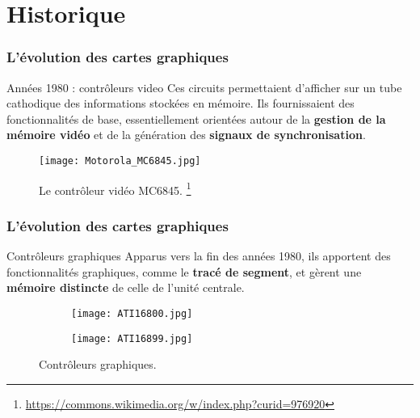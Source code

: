 \section{Historique}
\begin{frame}
    \frametitle{L'évolution des cartes graphiques}
\begin{block}{Années 1980 : contrôleurs video}
  Ces circuits permettaient d'afficher sur un tube cathodique 
  des informations stockées en mémoire. Ils fournissaient des fonctionnalités de base, essentiellement orientées
  autour de la {\bf gestion de la mémoire vidéo} et de la génération des {\bf signaux de synchronisation}. 
  \begin{figure}[ht]
    \centering
    \texttt{[image: Motorola\_MC6845.jpg]}
    \caption{Le contrôleur vidéo MC6845. \footnote{\tiny \url{https://commons.wikimedia.org/w/index.php?curid=976920}}}
    \label{fig:MC6845}
  \end{figure}
\end{block}
\end{frame}
\begin{frame}
  \frametitle{L'évolution des cartes graphiques}
\begin{block}{Contrôleurs graphiques}
  Apparus vers la fin des années 1980, ils apportent des fonctionnalités graphiques, comme le {\bf tracé de segment}, 
  et gèrent une {\bf mémoire distincte} de celle de l'unité centrale.
   \begin{figure}[htbp]
    \centering
    \hfill
   \begin{subfigure}{0.4\textwidth}
    \texttt{[image: ATI16800.jpg]}
   \end{subfigure} 
   \hfill
   \begin{subfigure}{0.4\textwidth}
    \texttt{[image: ATI16899.jpg]}
   \end{subfigure} 
   \hfill
    \caption{Contrôleurs graphiques.}
    \label{fig:graphic_controllers}
   \end{figure}
\end{block}
\end{frame}
